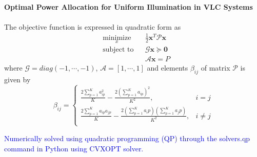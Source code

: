 \documentclass{beamer}
\providecommand{\sbrak}[1]{\ensuremath{{}\left[#1\right]}}
\providecommand{\brak}[1]{\ensuremath{\left(#1\right)}}
\theoremstyle{remark}
\begin{document}
\begin{frame}
\frametitle{\,}
\framesubtitle{Optimal Power Allocation for Uniform Illumination in VLC Systems}
\begin{list}{}{}
\vfill
\item<1-> The objective function is expressed in quadratic form as
\begin{equation}
\label{var_obj}
\begin{aligned}
& \underset{x}{\text{minimize}}
& & \frac{1}{2}\textbf{x}^T\mathcal{P}\textbf{x}\\
& \text{subject to}
& & \mathcal{G}\textbf{x} \succeq \textbf{0}\\
& & &\mathcal{A}\textbf{x}=P
\end{aligned}\nonumber
\end{equation}
where $\mathcal{G}=diag\brak{-1,\cdots,-1}$, $\mathcal{A}=\sbrak{1,\cdots,1}$ and elements $\beta_{ij}$ of matrix $\mathcal{P}$ is given by
\begin{equation}
\beta_{ij}=
\begin{cases}
\frac{2\sum_{p=1}^Ka_{ip}^2}{K}-\frac{2\brak{\sum_{p=1}^Ka_{ip}}^2}{K^2}, & i=j\\
\frac{2\sum_{p=1}^Ka_{ip}a_{jp}}{K}-\frac{2\brak{\sum_{p=1}^Ka_ip}\brak{\sum_{p=1}^Ka_jp}}{K^2}, & i \neq j\\
\end{cases}\nonumber
\end{equation}
\vfill
\item<2>
\textcolor{blue}{ Numerically solved using quadratic programming (QP)
through the solvers.qp command in Python using CVXOPT solver.}
\vfill
\end{list} 
\end{frame}
\end{document}
